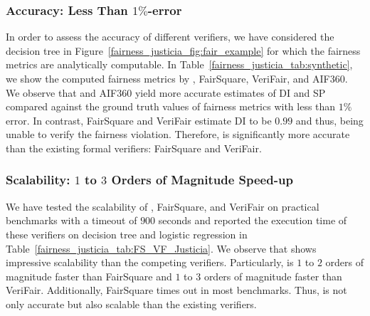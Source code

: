 


\subsubsection{Accuracy: Less Than $  1\%$-error} 
In order to assess the accuracy of different verifiers, we have considered the decision tree in Figure~\ref{fairness_justicia_fig:fair_example} for which the fairness metrics  are analytically computable. 
In Table~\ref{fairness_justicia_tab:synthetic}, we show the computed fairness metrics by {\justicia}, FairSquare, VeriFair, and AIF360. We observe that {\justicia} and AIF360  yield more accurate estimates of DI and SP compared against the ground truth values of fairness metrics with less than $1\%$ error. In contrast, FairSquare and VeriFair  estimate DI to be $0.99$ and thus, being unable to verify the fairness violation. Therefore, {\justicia} is significantly more accurate than the existing formal verifiers: FairSquare and VeriFair. 





\subsubsection{Scalability: $ 1 $ to $ 3 $ Orders of Magnitude Speed-up} 
We have tested the scalability of {\justicia}, FairSquare, and VeriFair on practical benchmarks with a timeout of $900$ seconds and reported the execution time of these verifiers on decision tree and logistic regression in Table~\ref{fairness_justicia_tab:FS_VF_Justicia}. We observe that {\justicia} shows impressive scalability than the competing verifiers. Particularly, {\justicia} is $ 1 $ to $ 2 $ orders of magnitude faster than FairSquare and  $ 1 $ to $ 3 $ orders of magnitude faster than VeriFair. Additionally, FairSquare times out in most  benchmarks.
Thus, {\justicia} is not only accurate but also scalable than the existing verifiers. 


